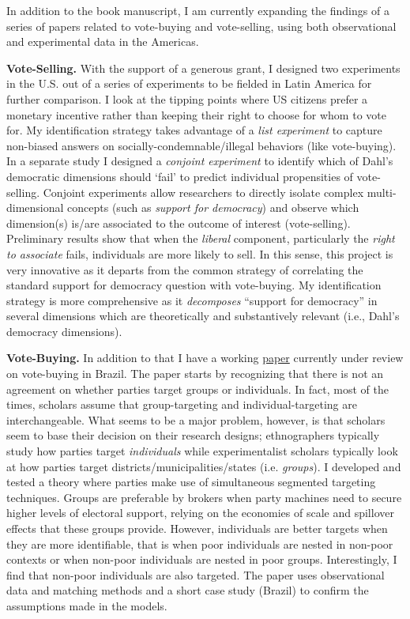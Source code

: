 \documentclass[10pt,stdletter,dateno,sigleft]{newlfm} %
\begin{document}
\begin{newlfm}
In addition to the book manuscript, I am currently expanding the findings of a series of papers related to vote-buying and vote-selling, using both observational and experimental data in the Americas. 

{\bf Vote-Selling.} With the support of a generous grant, I designed two experiments in the U.S. out of a series of experiments to be fielded in Latin America for further comparison. I look at the tipping points where US citizens prefer a monetary incentive rather than keeping their right to choose for whom to vote for. My identification strategy takes advantage of a \emph{list experiment} to capture non-biased answers on socially-condemnable/illegal behaviors (like vote-buying). In a separate study I designed a \emph{conjoint experiment} to identify which of Dahl's democratic dimensions should `fail' to predict individual propensities of vote-selling. Conjoint experiments allow researchers to directly isolate complex multi-dimensional concepts (such as \emph{support for democracy}) and observe which dimension(s) is/are associated to the outcome of interest (vote-selling). Preliminary results show that when the \emph{liberal} component, particularly the \emph{right to associate} fails, individuals are more likely to sell. In this sense, this project is very innovative as it departs from the common strategy of correlating the standard support for democracy question with vote-buying. My identification strategy is more comprehensive as it \emph{decomposes} ``support for democracy'' in several dimensions which are theoretically and substantively relevant (i.e., Dahl's democracy dimensions). 

{\bf Vote-Buying.} In addition to that I have a working \href{https://github.com/hbahamonde/Clientelism_paper/raw/master/Bahamonde_Clientelism_Paper.pdf}{paper} currently under review on vote-buying in Brazil. The paper starts by recognizing that there is not an agreement on whether parties target groups or individuals. In fact, most of the times, scholars assume that group-targeting and individual-targeting are interchangeable. What seems to be a major problem, however, is that scholars seem to base their decision on their research designs; ethnographers typically study how parties target \emph{individuals} while experimentalist scholars typically look at how parties target districts/municipalities/states (i.e. \emph{groups}). I developed and tested a theory where parties make use of simultaneous segmented targeting techniques. Groups are preferable by brokers when party machines need to secure higher levels of electoral support, relying on the economies of scale and spillover effects that these groups provide. However, individuals are better targets when they are more identifiable, that is when poor individuals are nested in non-poor contexts or when non-poor individuals are nested in poor groups. Interestingly, I find that non-poor individuals are also targeted. The paper uses observational data and matching methods and a short case study (Brazil) to confirm the assumptions made in the models.


\end{newlfm}
\end{document}
